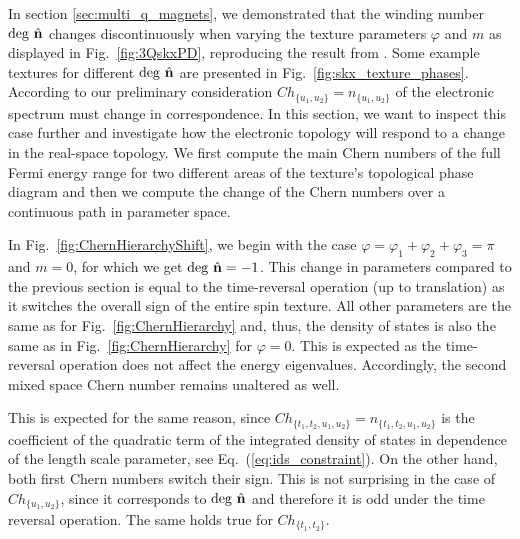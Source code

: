 \documentclass[submission, Phys]{SciPost}
\begin{document}
In section \ref{sec:multi_q_magnets}, we demonstrated that the winding number $\mathrm{deg}~\hat{\mathbf{n}}$ changes discontinuously when varying the texture parameters $\varphi$ and $m$ as displayed in Fig.~\ref{fig:3QskxPD}, reproducing the result from \cite{Shimizu2022}. Some example textures for different $\mathrm{deg}~\hat{\mathbf{n}}$ are presented in Fig.~\ref{fig:skx_texture_phases}.
According to our preliminary consideration $Ch_{\lbrace u_1, u_2 \rbrace }=n_{\lbrace u_1, u_2 \rbrace }$ of the electronic spectrum must change in correspondence.
In this section, we want to inspect this case further and investigate how the electronic topology will respond to a change in the real-space topology. 
We first compute the main Chern numbers of the full Fermi energy range for two different areas of the texture's topological phase diagram and then we compute the change of the Chern numbers over a continuous path in parameter space.

\figureVI

In Fig.~\ref{fig:ChernHierarchyShift}, we begin with the case $\varphi=\varphi_1+\varphi_2+\varphi_3=\pi$ and $m=0$, for which we get $\mathrm{deg}~\hat{\mathbf{n}}=-1$.  
This change in parameters compared to the previous section is equal to the time-reversal operation (up to translation) as it switches the overall sign of the entire spin texture. 
All other parameters are the same as for Fig.~\ref{fig:ChernHierarchy} and, thus, the density of states is also the same as in Fig.~\ref{fig:ChernHierarchy} for $\varphi=0$. This is expected as the time-reversal operation does not affect the energy eigenvalues. 
Accordingly, the second mixed space Chern number remains unaltered as well.

\figureVII
\figureVIII

This is expected for the same reason, since $Ch_{\lbrace t_1, t_2, u_1, u_2 \rbrace }=n_{\lbrace t_1, t_2, u_1, u_2 \rbrace }$ is the coefficient of the quadratic term of the integrated density of states in dependence of the length scale parameter, see Eq.~(\ref{eq:ids_constraint}).
On the other hand, both first Chern numbers switch their sign. 
This is not surprising in the case of $Ch_{\lbrace u_1, u_2 \rbrace }$, since it corresponds to $\mathrm{deg}~\hat{\mathbf{n}}$ and therefore it is odd under the time reversal operation. 
The same holds true for  $Ch_{\lbrace t_1, t_2 \rbrace }$.
\end{document}
